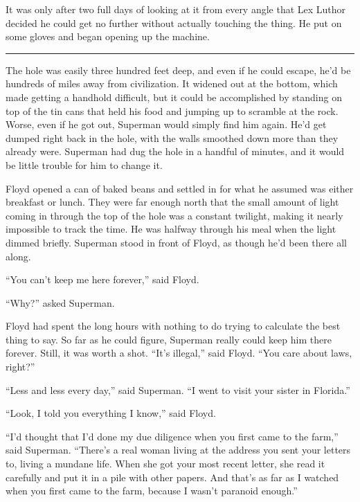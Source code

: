 It was only after two full days of looking at it from every angle that
Lex Luthor decided he could get no further without actually touching the
thing. He put on some gloves and began opening up the machine.

\begin{center}\rule{0.5\linewidth}{\linethickness}\end{center}

The hole was easily three hundred feet deep, and even if he could
escape, he'd be hundreds of miles away from civilization. It widened out
at the bottom, which made getting a handhold difficult, but it could be
accomplished by standing on top of the tin cans that held his food and
jumping up to scramble at the rock. Worse, even if he got out, Superman
would simply find him again. He'd get dumped right back in the hole,
with the walls smoothed down more than they already were. Superman had
dug the hole in a handful of minutes, and it would be little trouble for
him to change it.

Floyd opened a can of baked beans and settled in for what he assumed was
either breakfast or lunch. They were far enough north that the small
amount of light coming in through the top of the hole was a constant
twilight, making it nearly impossible to track the time. He was halfway
through his meal when the light dimmed briefly. Superman stood in front
of Floyd, as though he'd been there all along.

``You can't keep me here forever,'' said Floyd.

``Why?'' asked Superman.

Floyd had spent the long hours with nothing to do trying to calculate
the best thing to say. So far as he could figure, Superman really could
keep him there forever. Still, it was worth a shot. ``It's illegal,''
said Floyd. ``You care about laws, right?''

``Less and less every day,'' said Superman. ``I went to visit your
sister in Florida.''

``Look, I told you everything I know,'' said Floyd.

``I'd thought that I'd done my due diligence when you first came to the
farm,'' said Superman. ``There's a real woman living at the address you
sent your letters to, living a mundane life. When she got your most
recent letter, she read it carefully and put it in a pile with other
papers. And that's as far as I watched when you first came to the farm,
because I wasn't paranoid enough.''

